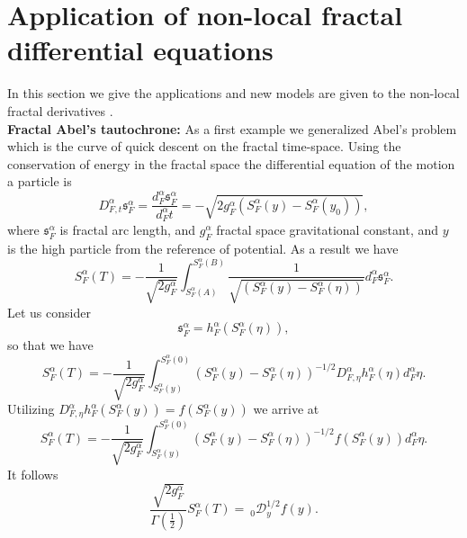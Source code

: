 \documentclass[12pt]{article}
\begin{document}
\section{Application of non-local fractal differential equations \label{6-sec} }
 In this section we give the applications and  new models are given to the non-local fractal derivatives \cite{Golmankhaneh-107-k}.\\
\textbf{Fractal Abel's tautochrone:}  As a first example we generalized Abel's problem which is the curve  of quick descent on the fractal time-space. Using the conservation of energy in the fractal space the differential equation of the motion a particle is
\begin{equation}\label{swewaw}
  D_{F,t}^{\alpha} \mathfrak{s}_{F}^{\alpha}=\frac{d_{F}^{\alpha}\mathfrak{s}_{F}^{\alpha}}{d_{F}^{\alpha} t}=-\sqrt{2g_{F}^{\alpha}(S_{F}^{\alpha}(y)-S_{F}^{\alpha}(y_{0}))},
\end{equation}
where $\mathfrak{s}_{F}^{\alpha}$ is fractal arc length, and  $g_{F}^{\alpha}$ fractal space gravitational constant, and $y$ is the high particle from the reference of potential. As a result we have
\begin{equation}\label{vgtr}
S_{F}^{\alpha}(T)=-\frac{1}{\sqrt{2 g_{F}^{\alpha}}}\int_{S_{F}^{\alpha}(A)}^{S_{F}^{\alpha}(B)}\frac{1}{\sqrt{(S_{F}^{\alpha}(y)-S_{F}^{\alpha}(\eta))}}
d_{F}^{\alpha}\mathfrak{s}_{F}^{\alpha}.
\end{equation}
Let us consider
\begin{equation}\label{b}
  \mathfrak{s}_{F}^{\alpha}=h_{F}^{\alpha}(S_{F}^{\alpha}(\eta)),
\end{equation}
so that we have
\begin{equation}\label{vgtr}
S_{F}^{\alpha}(T)=-\frac{1}{\sqrt{2 g_{F}^{\alpha}}}\int_{S_{F}^{\alpha}(y)}^{S_{F}^{\alpha}(0)}(S_{F}^{\alpha}(y)-S_{F}^{\alpha}(\eta))^{-1/2}D^{\alpha}_{F,\eta}h_{F}^{\alpha}(\eta)
d_{F}^{\alpha}\eta.
\end{equation}
Utilizing  $D^{\alpha}_{F,\eta}h_{F}^{\alpha}(S_{F}^{\alpha}(y))=f(S_{F}^{\alpha}(y))$ we arrive at
\begin{equation}\label{vgtr}
S_{F}^{\alpha}(T)=-\frac{1}{\sqrt{2 g_{F}^{\alpha}}}\int_{S_{F}^{\alpha}(y)}^{S_{F}^{\alpha}(0)}(S_{F}^{\alpha}(y)-S_{F}^{\alpha}(\eta))^{-1/2}f(S_{F}^{\alpha}(y))
d_{F}^{\alpha}\eta.
\end{equation}
It follows
\begin{equation}\label{bvlkcx}
\frac{\sqrt{2 g_{F}^{\alpha}}}{\Gamma(\frac{1}{2})}  S_{F}^{\alpha}(T)=~_{0}\mathcal{D}_{y}^{1/2} f(y).
\end{equation}
\end{document}
